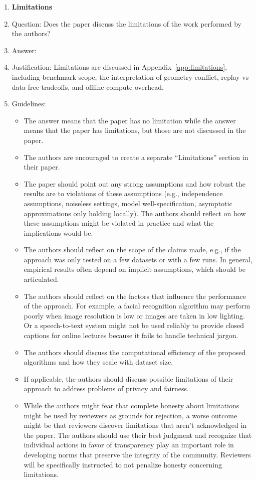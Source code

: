 \documentclass{article}
\begin{document}
\begin{enumerate}
\item {\bf Limitations}
    \item[] Question: Does the paper discuss the limitations of the work performed by the authors?
    \item[] Answer: \answerYes{} %
    \item[] Justification: Limitations are discussed in Appendix~\ref{app:limitations}, including benchmark scope, the interpretation of geometry conflict, replay-vs-data-free tradeoffs, and offline compute overhead.
    \item[] Guidelines:
    \begin{itemize}
        \item The answer \answerNA{} means that the paper has no limitation while the answer \answerNo{} means that the paper has limitations, but those are not discussed in the paper. 
        \item The authors are encouraged to create a separate ``Limitations'' section in their paper.
        \item The paper should point out any strong assumptions and how robust the results are to violations of these assumptions (e.g., independence assumptions, noiseless settings, model well-specification, asymptotic approximations only holding locally). The authors should reflect on how these assumptions might be violated in practice and what the implications would be.
        \item The authors should reflect on the scope of the claims made, e.g., if the approach was only tested on a few datasets or with a few runs. In general, empirical results often depend on implicit assumptions, which should be articulated.
        \item The authors should reflect on the factors that influence the performance of the approach. For example, a facial recognition algorithm may perform poorly when image resolution is low or images are taken in low lighting. Or a speech-to-text system might not be used reliably to provide closed captions for online lectures because it fails to handle technical jargon.
        \item The authors should discuss the computational efficiency of the proposed algorithms and how they scale with dataset size.
        \item If applicable, the authors should discuss possible limitations of their approach to address problems of privacy and fairness.
        \item While the authors might fear that complete honesty about limitations might be used by reviewers as grounds for rejection, a worse outcome might be that reviewers discover limitations that aren't acknowledged in the paper. The authors should use their best judgment and recognize that individual actions in favor of transparency play an important role in developing norms that preserve the integrity of the community. Reviewers will be specifically instructed to not penalize honesty concerning limitations.
    \end{itemize}


\end{enumerate}
\end{document}
